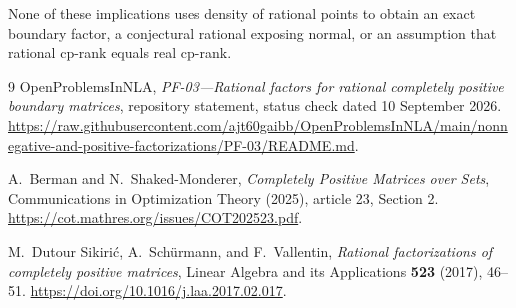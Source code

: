 \documentclass[11pt]{article}
\theoremstyle{definition}
\numberwithin{equation}{section}
\begin{document}
None of these implications uses density of rational points to obtain an
exact boundary factor, a conjectural rational exposing normal, or an
assumption that rational cp-rank equals real cp-rank.

\begin{thebibliography}{9}
OpenProblemsInNLA,
\emph{PF-03---Rational factors for rational completely positive boundary
matrices}, repository statement, status check dated 10 September 2026.
\url{https://raw.githubusercontent.com/ajt60gaibb/OpenProblemsInNLA/main/nonnegative-and-positive-factorizations/PF-03/README.md}.

A.~Berman and N.~Shaked-Monderer,
\emph{Completely Positive Matrices over Sets},
Communications in Optimization Theory (2025), article 23, Section 2.
\url{https://cot.mathres.org/issues/COT202523.pdf}.

M.~Dutour Sikiri\'c, A.~Sch\"urmann, and F.~Vallentin,
\emph{Rational factorizations of completely positive matrices},
Linear Algebra and its Applications \textbf{523} (2017), 46--51.
\url{https://doi.org/10.1016/j.laa.2017.02.017}.
\end{thebibliography}
\end{document}
